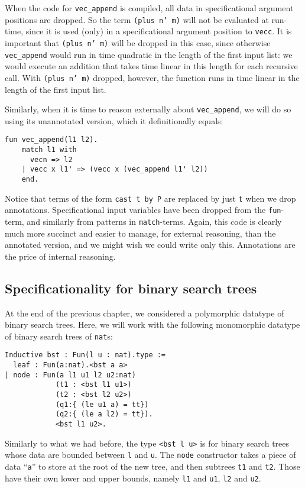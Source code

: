 \documentclass{book}[12pt]
\begin{document}
When the code for \texttt{vec\_append} is compiled, all data in
specificational argument positions are dropped.  So the term
\texttt{(plus n' m)} will not be evaluated at run-time, since it is
used (only) in a specificational argument position to \texttt{vecc}.
It is important that \texttt{(plus n' m)} will be dropped in this
case, since otherwise \texttt{vec\_append} would run in time quadratic
in the length of the first input list: we would execute an addition
that takes time linear in this length for each recursive call.  With
\texttt{(plus n' m)} dropped, however, the function runs in time
linear in the length of the first input list.

Similarly, when it is time to reason externally about
\texttt{vec\_append}, we will do so using its unannotated version,
which it definitionally equals:

\begin{verbatim}
fun vec_append(l1 l2).
    match l1 with
      vecn => l2 
    | vecc x l1' => (vecc x (vec_append l1' l2)) 
    end.
\end{verbatim}

\noindent Notice that terms of the form \texttt{cast t by P} are
replaced by just \texttt{t} when we drop annotations.  Specificational
input variables have been dropped from the \texttt{fun}-term, and
similarly from patterns in \texttt{match}-terms.  Again, this code is
clearly much more succinct and easier to manage, for external
reasoning, than the annotated version, and we might wish we could
write only this.  Annotations are the price of internal reasoning.

\subsection{Specificationality for binary search trees}

At the end of the previous chapter, we considered a polymorphic
datatype of binary search trees.  Here, we will work with the
following monomorphic datatype of binary search trees of
\texttt{nat}s:

\begin{verbatim}
Inductive bst : Fun(l u : nat).type :=
  leaf : Fun(a:nat).<bst a a>
| node : Fun(a l1 u1 l2 u2:nat)
            (t1 : <bst l1 u1>)
            (t2 : <bst l2 u2>)
            (q1:{ (le u1 a) = tt})
            (q2:{ (le a l2) = tt}).
            <bst l1 u2>.
\end{verbatim}

\noindent Similarly to what we had before, the type \texttt{<bst l u>}
is for binary search trees whose data are bounded between \texttt{l}
and \texttt{u}.  The \texttt{node} constructor takes a piece of data
``\texttt{a}'' to store at the root of the new tree, and then subtrees
\texttt{t1} and \texttt{t2}.  Those have their own lower and upper
bounds, namely \texttt{l1} and \texttt{u1}, \texttt{l2} and
\texttt{u2}.  
\end{document}
